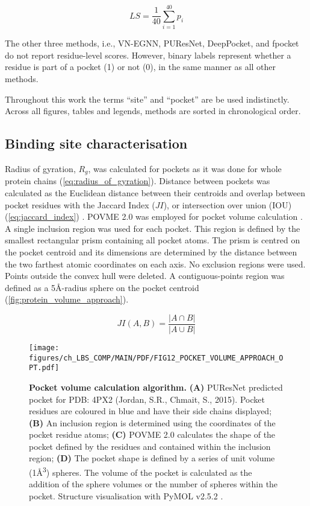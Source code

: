\begin{equation}
LS = \frac{1}{40} \sum_{i=1}^{40} p_i
\label{eq:IFSP_score}
\end{equation}

The other three methods, i.e., VN-EGNN, PUResNet, DeepPocket, and fpocket do not report residue-level scores. However, binary labels represent whether a residue is part of a pocket (1) or not (0), in the same manner as all other methods.

Throughout this work the terms ``site'' and ``pocket'' are be used indistinctly. Across all figures, tables and legends, methods are sorted in chronological order.

\subsection{Binding site characterisation}

Radius of gyration, $R_{g}$, was calculated for pockets as it was done for whole protein chains (\autoref{eq:radius_of_gyration}). Distance between pockets was calculated as the Euclidean distance between their centroids and overlap between pocket residues with the Jaccard Index ($JI$), or intersection over union (IOU) (\autoref{eq:jaccard_index}) \cite{JACCARD_1901_INDEX, JACCARD_1912_INDEX}. POVME 2.0 was employed for pocket volume calculation \cite{DURRANT_2011_POVME, DURRANT_2014_POVME2, WAGNER_2017_POVME3}. A single inclusion region was used for each pocket. This region is defined by the smallest rectangular prism containing all pocket atoms. The prism is centred on the pocket centroid and its dimensions are determined by the distance between the two farthest atomic coordinates on each axis. No exclusion regions were used. Points outside the convex hull were deleted. A contiguous-points region was defined as a 5\AA{}-radius sphere on the pocket centroid (\autoref{fig:protein_volume_approach}).

\begin{equation}
JI(A, B) = \frac{|A \cap B|}{|A \cup B|}
\label{eq:jaccard_index}
\end{equation}

\begin{figure}[h]
    \centering
    \texttt{[image: figures/ch\_LBS\_COMP/MAIN/PDF/FIG12\_POCKET\_VOLUME\_APPROACH\_OPT.pdf]}
    \caption[Pocket volume calculation algorithm]{\textbf{Pocket volume calculation algorithm.} \textbf{(A)} PUResNet predicted pocket for PDB: 4PX2 (Jordan, S.R., Chmait, S., 2015). Pocket residues are coloured in blue and have their side chains displayed; \textbf{(B)} An inclusion region is determined using the coordinates of the pocket residue atoms; \textbf{(C)} POVME 2.0 calculates the shape of the pocket defined by the residues and contained within the inclusion region; \textbf{(D)} The pocket shape is defined by a series of unit volume (1\AA{}\textsuperscript{3}) spheres. The volume of the pocket is calculated as the addition of the sphere volumes or the number of spheres within the pocket. Structure visualisation with PyMOL v2.5.2 \cite{SCHRODINGER_2015_PYMOL}.}
    \label{fig:protein_volume_approach}
\end{figure}

